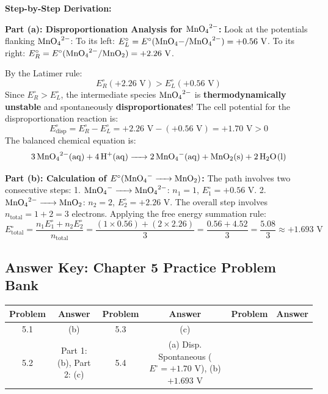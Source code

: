 \begin{solution}
\textbf{Step-by-Step Derivation:}

\textbf{Part (a): Disproportionation Analysis for $\ce{MnO4^2-}$:}
Look at the potentials flanking $\ce{MnO4^2-}$:
To its left: $E^\circ_L = E^\circ(\ce{MnO4-/MnO4^2-}) = +0.56\text{ V}$.
To its right: $E^\circ_R = E^\circ(\ce{MnO4^2-/MnO2}) = +2.26\text{ V}$.

By the Latimer rule:
\begin{equation*}
    E^\circ_R (+2.26\text{ V}) > E^\circ_L (+0.56\text{ V})
\end{equation*}
Since $E^\circ_R > E^\circ_L$, the intermediate species $\ce{MnO4^2-}$ is \textbf{thermodynamically unstable} and spontaneously \textbf{disproportionates}!
The cell potential for the disproportionation reaction is:
\begin{equation*}
    E^\circ_{\text{disp}} = E^\circ_R - E^\circ_L = +2.26\text{ V} - (+0.56\text{ V}) = +1.70\text{ V} > 0
\end{equation*}
The balanced chemical equation is:
\begin{equation*}
    \ce{3MnO4^2-(aq) + 4H+(aq) -> 2MnO4-(aq) + MnO2(s) + 2H2O(l)}
\end{equation*}

\textbf{Part (b): Calculation of $E^\circ(\ce{MnO4- -> MnO2})$:}
The path involves two consecutive steps:
1. $\ce{MnO4- -> MnO4^2-}$: $n_1 = 1$, $E^\circ_1 = +0.56\text{ V}$.
2. $\ce{MnO4^2- -> MnO2}$: $n_2 = 2$, $E^\circ_2 = +2.26\text{ V}$.
The overall step involves $n_{\text{total}} = 1 + 2 = 3$ electrons.
Applying the free energy summation rule:
\begin{equation*}
    E^\circ_{\text{total}} = \frac{n_1 E^\circ_1 + n_2 E^\circ_2}{n_{\text{total}}} = \frac{(1 \times 0.56) + (2 \times 2.26)}{3} = \frac{0.56 + 4.52}{3} = \frac{5.08}{3} \approx +1.693\text{ V}
\end{equation*}
\end{solution}

\ifshowsolutions
\else
\newpage
\subsection*{Answer Key: Chapter 5 Practice Problem Bank}

\begin{center}
\renewcommand{\arraystretch}{1.3}
\begin{tabular}{|c|c||c|c||c|c|}
\hline
\textbf{Problem} & \textbf{Answer} & \textbf{Problem} & \textbf{Answer} & \textbf{Problem} & \textbf{Answer} \\
\hline
5.1 & (b) & 5.3 & (c) & & \\
5.2 & Part 1: (b), Part 2: (c) & 5.4 & (a) Disp. Spontaneous ($E^\circ = +1.70\text{ V}$), (b) $+1.693\text{ V}$ & & \\
\hline
\end{tabular}
\end{center}
\fi
